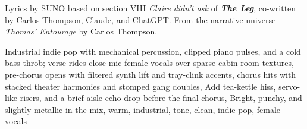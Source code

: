 
\begin{notes}
Lyrics by SUNO based on section VIII \emph{Claire didn’t ask} of \emph{\bfseries The Leg}, %
co-written by Carlos Thompson, Claude, and ChatGPT. %
From the narrative universe \emph{Thomas’ Entourage} by Carlos Thompson.
\end{notes}
\begin{style}
Industrial indie pop with mechanical percussion, clipped piano pulses, and a cold bass throb; verse rides close-mic female vocals over sparse cabin-room textures, pre-chorus opens with filtered synth lift and tray-clink accents, chorus hits with stacked theater harmonies and stomped gang doubles, Add tea-kettle hiss, servo-like risers, and a brief aisle-echo drop before the final chorus, Bright, punchy, and slightly metallic in the mix, warm, industrial, tone, clean, indie pop, female vocals
\end{style}
